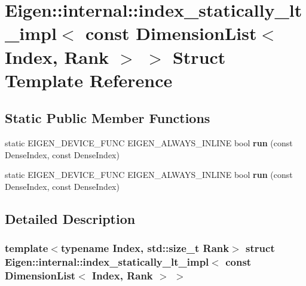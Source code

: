 \hypertarget{struct_eigen_1_1internal_1_1index__statically__lt__impl_3_01const_01_dimension_list_3_01_index_00_01_rank_01_4_01_4}{}\section{Eigen\+:\+:internal\+:\+:index\+\_\+statically\+\_\+lt\+\_\+impl$<$ const Dimension\+List$<$ Index, Rank $>$ $>$ Struct Template Reference}
\label{struct_eigen_1_1internal_1_1index__statically__lt__impl_3_01const_01_dimension_list_3_01_index_00_01_rank_01_4_01_4}
\subsection*{Static Public Member Functions}
\begin{DoxyCompactItemize}
\item 
\mbox{\label{struct_eigen_1_1internal_1_1index__statically__lt__impl_3_01const_01_dimension_list_3_01_index_00_01_rank_01_4_01_4_a8c108656c69d1eddb737a804bd304d88}} 
static E\+I\+G\+E\+N\+\_\+\+D\+E\+V\+I\+C\+E\+\_\+\+F\+U\+NC E\+I\+G\+E\+N\+\_\+\+A\+L\+W\+A\+Y\+S\+\_\+\+I\+N\+L\+I\+NE bool {\bfseries run} (const Dense\+Index, const Dense\+Index)
\item 
\mbox{\label{struct_eigen_1_1internal_1_1index__statically__lt__impl_3_01const_01_dimension_list_3_01_index_00_01_rank_01_4_01_4_a8c108656c69d1eddb737a804bd304d88}} 
static E\+I\+G\+E\+N\+\_\+\+D\+E\+V\+I\+C\+E\+\_\+\+F\+U\+NC E\+I\+G\+E\+N\+\_\+\+A\+L\+W\+A\+Y\+S\+\_\+\+I\+N\+L\+I\+NE bool {\bfseries run} (const Dense\+Index, const Dense\+Index)
\end{DoxyCompactItemize}


\subsection{Detailed Description}
\subsubsection*{template$<$typename Index, std\+::size\+\_\+t Rank$>$\newline
struct Eigen\+::internal\+::index\+\_\+statically\+\_\+lt\+\_\+impl$<$ const Dimension\+List$<$ Index, Rank $>$ $>$}



